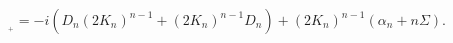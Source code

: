 \begin{equation}
[S^+_{n,n},S^-_{n,n-1}]_{{}_+}=-i
(D_n (2K_n)^{n-1}+(2K_n)^{n-1}D_n)+(2K_n)^{n-1}(\alpha_n+n
\Sigma).
\label{ssdk}
\end{equation}

